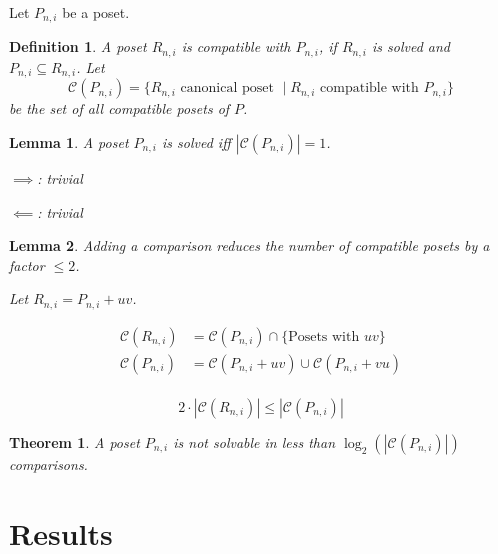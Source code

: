 \documentclass[10pt,journal,compsoc]{IEEEtran}
\newtheorem{theorem}{Theorem}
\newtheorem{lemma}{Lemma}
\newtheorem{definition}{Definition}
\begin{document}
Let $P_{n,i}$ be a poset.
\begin{definition}
  A poset $R_{n,i}$ is compatible with $P_{n,i}$, if $R_{n,i}$ is solved and $P_{n,i} \subseteq R_{n,i}$.
  Let $$\mathcal{C}(P_{n,i}) = \{ R_{n,i} \text{ canonical poset } \mid R_{n,i} \text{ compatible with } P_{n,i} \}$$ be the set of all compatible posets of $P$.
\end{definition}

\begin{lemma}
  A poset $P_{n,i}$ is solved iff $|\mathcal{C}(P_{n,i})| = 1$.

  $\implies$: trivial

  $\impliedby$: trivial
\end{lemma}

\begin{lemma}
  Adding a comparison reduces the number of compatible posets by a factor $\leq 2$.

  Let $R_{n,i} = P_{n,i} + uv$.

  \begin{align*}
    \mathcal{C}(R_{n,i}) & = \mathcal{C}(P_{n,i}) \cap \{ \text{Posets with } uv \}   \\
    \mathcal{C}(P_{n,i}) & = \mathcal{C}(P_{n,i} + uv) \cup \mathcal{C}(P_{n,i} + vu) \\
  \end{align*}

  $$2 \cdot |\mathcal{C}(R_{n,i})| \leq |\mathcal{C}(P_{n,i})|$$
\end{lemma}

\begin{theorem}
  A poset $P_{n,i}$ is not solvable in less than $\log_2(|\mathcal{C}(P_{n,i})|)$ comparisons.


\end{theorem}

\section{Results}
\end{document}
